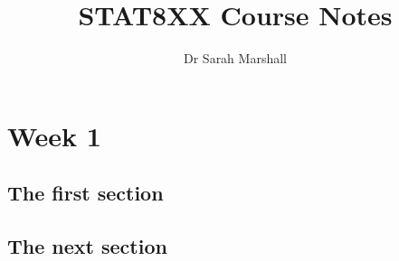 \documentclass[a4paper]{report}
\title{STAT8XX Course Notes}
\author{Dr Sarah Marshall}
\begin{document}
\maketitle


\tableofcontents
\chapter{Week 1}
\section{The first section}
\section{The next section}
\end{document}

